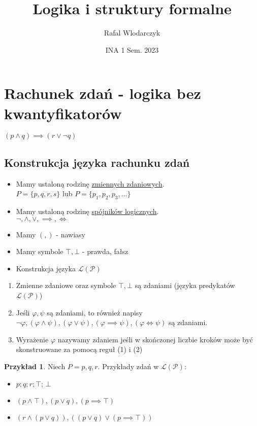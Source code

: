 \documentclass{article}
\author{Rafal Wlodarczyk}
\title{Logika i struktury formalne}
\date{INA 1 Sem. 2023}
\theoremstyle{definition}
\theoremstyle{definition}
\theoremstyle{definition}
\newtheorem{pk}{Przykład}[subsection]
\theoremstyle{definition}
\begin{document}
\maketitle

\section{Rachunek zdań - logika bez kwantyfikatorów}
\begin{center}
$(p\land q)\implies (r\lor \lnot q)$
\end{center}

\subsection{Konstrukcja języka rachunku zdań}
\begin{itemize}
    \item Mamy ustaloną rodzinę \underline{zmiennych zdaniowych}.\\
    $P=\{p,q,r,s\}$ lub $P=\{p_1,p_2,p_3,\dots\}$
    \item Mamy ustaloną rodzinę \underline{spójników logicznych}.\\
    $\neg,\land,\lor,\implies,\iff$
    \item Mamy $( , )$ - nawiasy
    \item Mamy symbole $\top, \bot$ - prawda, fałsz
    \item Konstrukcja języka $\mathcal{L}(\mathcal{P})$
\end{itemize}

\begin{enumerate}
    \item Zmienne zdaniowe oraz symbole $\top, \bot$ są zdaniami (języka predykatów $\mathcal{L}(\mathcal{P})$)
    \item Jeśli $\varphi, \psi$ są zdaniami, to również napisy $\neg \varphi, (\varphi \land \psi), (\varphi \lor \psi), (\varphi \implies \psi), (\varphi \iff \psi)$ są zdaniami.
    \item Wyrażenie $\varphi$ nazywamy zdaniem jeśli w skończonej liczbie kroków może być skonstruowane za pomocą reguł (1) i (2)
\end{enumerate}

\begin{pk}
    Niech $P={p,q,r}$. Przykłady zdań w $\mathcal{L}(\mathcal{P})$:
    \begin{itemize}
        \item $p;q;r; \top$; $\bot$
        \item $(p\land \top), (p\lor q), (p\implies \top)$
        \item $(r\land (p\lor q)), ((p\lor q)\lor (p\implies \top))$
    \end{itemize}
\end{pk}
\end{document}
